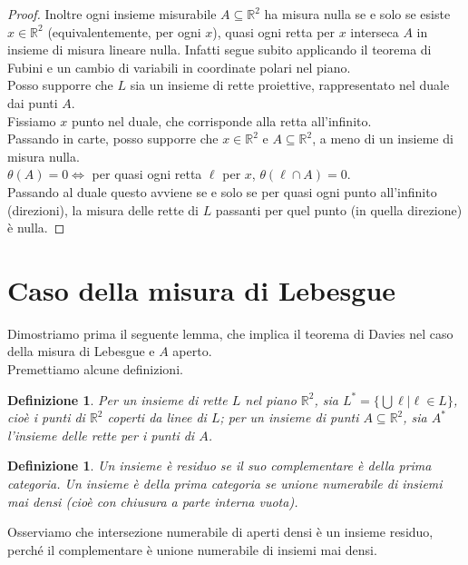 \documentclass[a4paper, twoside,openright]{article}
\newcommand{\LRa}{\Leftrightarrow}
\newcommand{\R}{\mathbb{R}}
\newcommand{\<}{\langle}
\renewcommand{\>}{\rangle}
\newtheorem{defin}[teo]{Definizione}
\begin{document}
\begin{proof}
	Inoltre ogni insieme misurabile $A \subseteq \R^2$ ha misura nulla se e solo se esiste $x \in \R^2$ (equivalentemente, per ogni $x$), quasi ogni retta per $x$ interseca $A$ in insieme di misura lineare nulla. Infatti segue subito applicando il teorema di Fubini e un cambio di variabili in coordinate polari nel piano.\\
	Posso supporre che $L$ sia un insieme di rette proiettive, rappresentato nel duale dai punti $A$.\\
	Fissiamo $x$ punto nel duale, che corrisponde alla retta all'infinito.\\
	Passando in carte, posso supporre che $x \in \R^2$ e $A\subseteq \R^2$, a meno di un insieme di misura nulla.\\
	$\theta(A)=0 \LRa$ per quasi ogni retta $\ell$ per $x$, $\theta(\ell \cap A)=0$.\\
	Passando al duale questo avviene se e solo se per quasi ogni punto all'infinito (direzioni), la misura delle rette di $L$ passanti per quel punto (in quella direzione) è nulla.
\end{proof}	



	
\newpage

\section{Caso della misura di Lebesgue}

Dimostriamo prima il seguente lemma, che implica il teorema di Davies nel caso della misura di Lebesgue e $A$ aperto.\\
Premettiamo alcune definizioni.

\begin{defin}
Per un insieme di rette $L$ nel piano $\R^2$, sia $L^{*}= \{\bigcup \ell | \ell \in L\}$, cioè i punti di $\R^2$ coperti da linee di $L$; per un insieme di punti $A \subseteq \R^2$, sia $A^{*}$ l'insieme delle rette per i punti di $A$.
\end{defin}

\begin{defin}
	Un insieme è residuo se il suo complementare è della prima categoria. Un insieme è della prima categoria se unione numerabile di insiemi mai densi (cioè con chiusura a parte interna vuota).
\end{defin}
Osserviamo che intersezione numerabile di aperti densi è un insieme residuo, perché il complementare è unione numerabile di insiemi mai densi.
\end{document}
